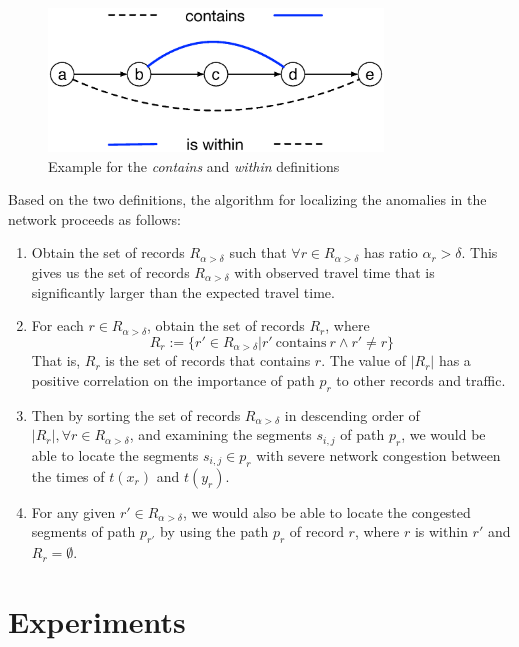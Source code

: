 \documentclass[conference]{IEEEtran.1.8}
\begin{document}
\begin{figure}
	\centering
	\includegraphics[width=3.5in]{contain_within_example}
	\caption{Example for the \emph{contains} and \emph{within} definitions}
	\label{fig:contain_within_example}
\end{figure}

Based on the two definitions, the algorithm for localizing the anomalies in the network proceeds as follows:
\begin{enumerate}
	\item Obtain the set of records $R_{\alpha > \delta}$ such that $\forall r \in R_{\alpha > \delta}$ has ratio $\alpha_r > \delta$. This gives us the set of records $R_{\alpha > \delta}$ with observed travel time that is significantly larger than the expected travel time.
	\item For each $r \in R_{\alpha > \delta}$, obtain the set of records $R_r$, where
	\[ R_{r} := \{ r' \in R_{\alpha > \delta} | r' ~ \text{contains} ~ r \land r' \neq r \} \]
	That is, $R_r$ is the set of records that contains $r$. The value of $|R_r|$ has a positive correlation on the importance of path $p_r$ to other records and traffic.
	\item Then by sorting the set of records $R_{\alpha > \delta}$ in descending order of $|R_r|, \forall r \in R_{\alpha > \delta}$, and examining the segments $s_{i,j}$ of path $p_r$, we would be able to locate the segments $s_{i,j} \in p_r$ with severe network congestion between the times of $t(x_r)$ and $t(y_r)$.
	\item For any given $r' \in R_{\alpha > \delta}$, we would also be able to locate the congested segments of path $p_{r'}$ by using the path $p_r$ of record $r$, where $r$ is within $r'$ and $R_r = \emptyset$.
\end{enumerate}

\section{Experiments}
\label{sec:experiments}
\end{document}
